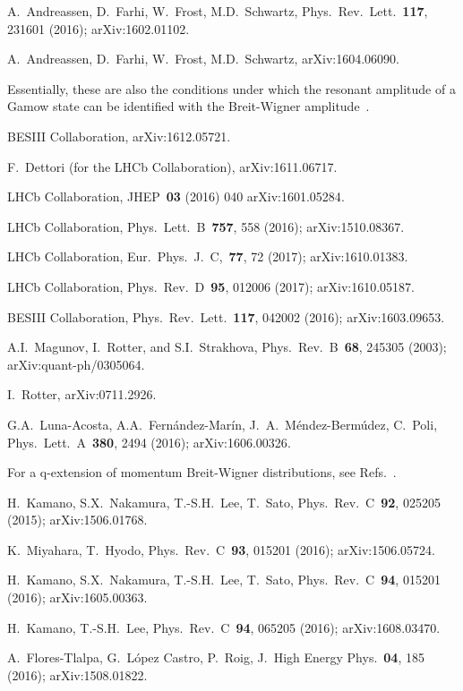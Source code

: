 \documentclass[12pt]{article}
\begin{document}
\begin{thebibliography}{99}
 A.~Andreassen, D.~Farhi, W.~Frost, M.D.~Schwartz,
Phys.~Rev.~Lett.~{\bf 117}, 231601 (2016); {\sf arXiv:1602.01102}.

 A.~Andreassen, D.~Farhi, W.~Frost, M.D.~Schwartz,
{\sf arXiv:1604.06090}.

 Essentially, these are also the conditions under 
which the resonant amplitude of a Gamow state can be identified with the
Breit-Wigner amplitude~\cite{NPA08}.


 BESIII Collaboration, {\sf arXiv:1612.05721}.

 F.~Dettori (for the LHCb Collaboration),  
{\sf arXiv:1611.06717}.

 LHCb Collaboration, JHEP~{\bf 03} (2016) 040
{\sf arXiv:1601.05284}.


 LHCb Collaboration, Phys.~Lett.~B~{\bf 757}, 558 
(2016); {\sf arXiv:1510.08367}.

 LHCb Collaboration, Eur.~Phys.~J.~C,~{\bf 77}, 72 (2017);
{\sf arXiv:1610.01383}.

 LHCb Collaboration, Phys.~Rev.~D~{\bf 95}, 012006 (2017);
{\sf arXiv:1610.05187}.

 BESIII Collaboration, 
Phys.~Rev.~Lett.~{\bf 117}, 042002 (2016); {\sf arXiv:1603.09653}.

 A.I.~Magunov, I.~Rotter, and S.I.~Strakhova, 
Phys.~Rev.~B~{\bf 68}, 245305 (2003); {\sf arXiv:quant-ph/0305064}.

 I.~Rotter, {\sf arXiv:0711.2926}.

 G.A.~Luna-Acosta, A.A.~Fern\'andez-Mar{\'i}n, 
J.~A.~M\'endez-Berm\'udez, C.~Poli, Phys.~Lett.~A~{\bf 380}, 2494 (2016);
{\sf arXiv:1606.00326}.

 For a q-extension of momentum Breit-Wigner distributions,
see Refs.~\cite{PLASTINO1,PLASTINO2}.

 H.~Kamano, S.X.~Nakamura, T.-S.H.~Lee, T.~Sato,
Phys.~Rev.~C~{\bf 92}, 025205 (2015); {\sf arXiv:1506.01768}.

 K.~Miyahara, T.~Hyodo, 
Phys.~Rev.~C~{\bf 93}, 015201 (2016); {\sf arXiv:1506.05724}.

 H.~Kamano, S.X.~Nakamura, T.-S.H.~Lee, T.~Sato, 
Phys.~Rev.~C~{\bf 94}, 015201 (2016); {\sf arXiv:1605.00363}.


 H.~Kamano, T.-S.H.~Lee, 
Phys.~Rev.~C~{\bf 94}, 065205 (2016); {\sf arXiv:1608.03470}.

 A.~Flores-Tlalpa, G.~L\'opez Castro, P.~Roig,
J.~High Energy Phys.~{\bf 04}, 185 (2016); {\sf arXiv:1508.01822}.


       



\end{thebibliography}
\end{document}
